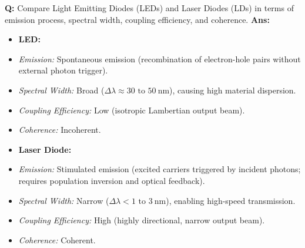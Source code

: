 \documentclass[10pt,a4paper,twocolumn]{article}
\begin{document}
\begin{tcolorbox}[
  colback=white,
  colframe=UnitColorFour,
  colbacktitle=gray!10!white,
  coltitle=black,
  fonttitle=\bfseries\sffamily\small,
  title={Unit IV $\bullet$ Card 1: LED vs. Laser Diode},
  boxrule=1.2pt,
  arc=2mm,
  outer arc=2mm,
  boxsep=1.5mm,
  top=1mm,
  bottom=1mm,
  left=1.5mm,
  right=1.5mm,
  before skip=2.5mm,
  after skip=2.5mm
]
\textbf{Q:} Compare Light Emitting Diodes (LEDs) and Laser Diodes (LDs) in terms of emission process, spectral width, coupling efficiency, and coherence.
\tcbline
\textbf{Ans:} \begin{itemize}
  \item   \textbf{LED:}
  \item   \textit{Emission:} Spontaneous emission (recombination of electron-hole pairs without external photon trigger).
  \item   \textit{Spectral Width:} Broad ($\Delta\lambda \approx 30 \text{ to } 50\ \text{nm}$), causing high material dispersion.
  \item   \textit{Coupling Efficiency:} Low (isotropic Lambertian output beam).
  \item   \textit{Coherence:} Incoherent.
  \item   \textbf{Laser Diode:}
  \item   \textit{Emission:} Stimulated emission (excited carriers triggered by incident photons; requires population inversion and optical feedback).
  \item   \textit{Spectral Width:} Narrow ($\Delta\lambda < 1 \text{ to } 3\ \text{nm}$), enabling high-speed transmission.
  \item   \textit{Coupling Efficiency:} High (highly directional, narrow output beam).
  \item   \textit{Coherence:} Coherent.
\end{itemize}
\end{tcolorbox}
\end{document}

